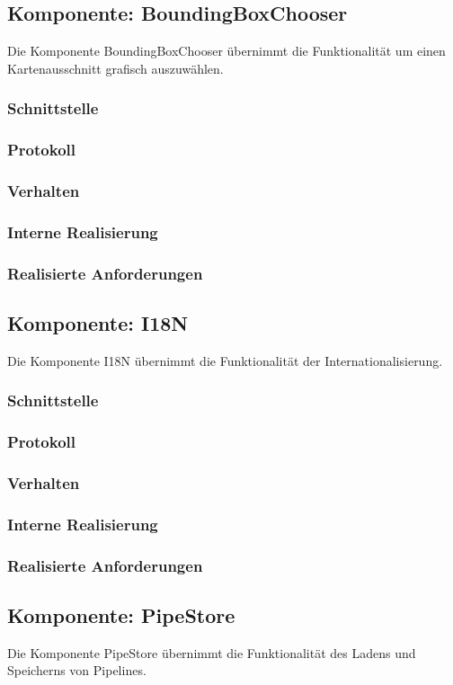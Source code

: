 \documentclass[a4paper,12pt]{scrartcl}
\begin{document}
\subsection{Komponente: BoundingBoxChooser}
Die Komponente BoundingBoxChooser übernimmt die Funktionalität um einen Kartenausschnitt grafisch auszuwählen.
\subsubsection{Schnittstelle}
\subsubsection{Protokoll}
\subsubsection{Verhalten}
\subsubsection{Interne Realisierung}
\subsubsection{Realisierte Anforderungen}

\subsection{Komponente: I18N}
Die Komponente I18N übernimmt die Funktionalität der Internationalisierung.
\subsubsection{Schnittstelle}
\subsubsection{Protokoll}
\subsubsection{Verhalten}
\subsubsection{Interne Realisierung}
\subsubsection{Realisierte Anforderungen}

\subsection{Komponente: PipeStore}
Die Komponente PipeStore übernimmt die Funktionalität des Ladens und Speicherns von Pipelines.
\end{document}
